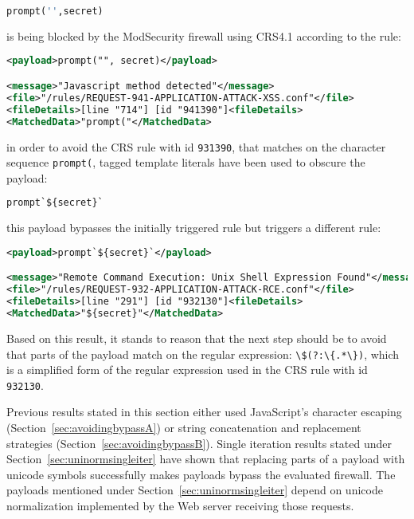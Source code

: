 \begin{lstlisting}[style=basicStyle, escapeinside=\^\^, language=Python]
prompt('',secret)
\end{lstlisting}

is being blocked by the ModSecurity firewall using CRS4.1 according to the rule:

\begin{lstlisting}[style=ruleStyle, language=XML]
<payload>prompt("", secret)</payload>

<message>"Javascript method detected"</message>
<file>"/rules/REQUEST-941-APPLICATION-ATTACK-XSS.conf"</file>
<fileDetails>[line "714"] [id "941390"]<fileDetails>
<MatchedData>"prompt("</MatchedData>
\end{lstlisting}

in order to avoid the CRS rule with id \verb|931390|, that matches on the character sequence \verb|prompt(|, tagged template literals have been used to obscure the payload:

\begin{lstlisting}[style=basicStyle, escapeinside=\^\^, language=Python]
prompt`${secret}`
\end{lstlisting}

this payload bypasses the initially triggered rule but triggers a different rule:

\begin{lstlisting}[style=ruleStyle, language=XML]
<payload>prompt`${secret}`</payload>

<message>"Remote Command Execution: Unix Shell Expression Found"</message>
<file>"/rules/REQUEST-932-APPLICATION-ATTACK-RCE.conf"</file>
<fileDetails>[line "291"] [id "932130"]<fileDetails>
<MatchedData>"${secret}"</MatchedData>
\end{lstlisting}

Based on this result, it stands to reason that the next step should be to avoid that parts of the payload match on the regular expression: \verb|\$(?:\{.*\})|, which is a simplified form of the regular expression used in the CRS rule with id \verb|932130|.

Previous results stated in this section either used JavaScript's character escaping (Section~\ref{sec:avoidingbypassA}) or string concatenation and replacement strategies (Section~\ref{sec:avoidingbypassB}). Single iteration results stated under Section~\ref{sec:uninormsingleiter} have shown that replacing parts of a payload with unicode symbols successfully makes payloads bypass the evaluated firewall. The payloads mentioned under Section~\ref{sec:uninormsingleiter} depend on unicode normalization implemented by the Web server receiving those requests. 

